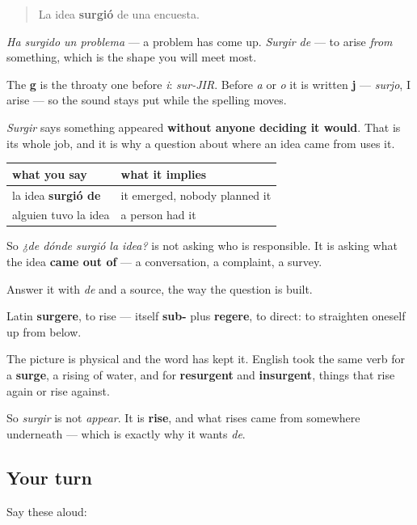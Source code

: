 \begin{quote}
La idea \textbf{surgió} de una encuesta.
\end{quote}

\emph{Ha surgido un problema} — a problem has come up. \emph{Surgir de} — to arise \emph{from} something, which is the shape you will meet most.

The \textbf{g} is the throaty one before \emph{i}: \emph{sur-JIR}. Before \emph{a} or \emph{o} it is written \textbf{j} — \emph{surjo}, I arise — so the sound stays put while the spelling moves.

\begin{grammarlens}[title={Grammar Lens: the verb that reports an origin}]
\emph{Surgir} says something appeared \textbf{without anyone deciding it would}. That is its whole job, and it is why a question about where an idea came from uses it.

\noindent
\begin{tabularx}{\linewidth}{@{}>{\raggedright\arraybackslash}X>{\raggedright\arraybackslash}X@{}}
\toprule
\textbf{what you say} & \textbf{what it implies} \\
\midrule
la idea \textbf{surgió de} & it emerged, nobody planned it \\
alguien tuvo la idea & a person had it \\
\bottomrule
\end{tabularx}

So \emph{¿de dónde surgió la idea?} is not asking who is responsible. It is asking what the idea \textbf{came out of} — a conversation, a complaint, a survey.

Answer it with \emph{de} and a source, the way the question is built.
\end{grammarlens}

\begin{cousinweb}
Latin \textbf{surgere}, to rise — itself \textbf{sub-} plus \textbf{regere}, to direct: to straighten oneself up from below.

The picture is physical and the word has kept it. English took the same verb for a \textbf{surge}, a rising of water, and for \textbf{resurgent} and \textbf{insurgent}, things that rise again or rise against.

So \emph{surgir} is not \emph{appear}. It is \textbf{rise}, and what rises came from somewhere underneath — which is exactly why it wants \emph{de}.
\end{cousinweb}

\subsection*{Your turn}
Say these aloud:

